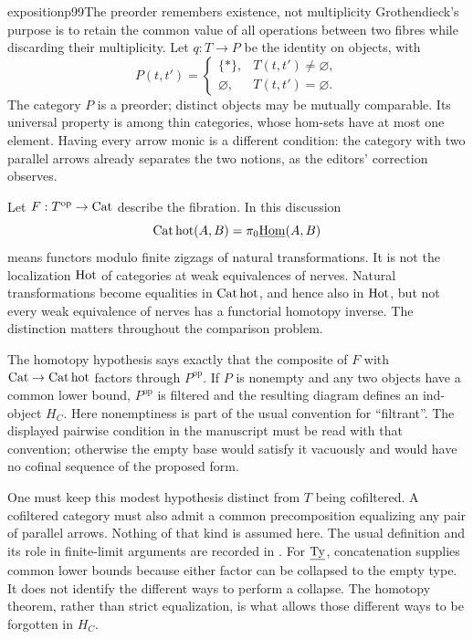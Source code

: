 \begin{dcomment}{exposition}{p99}{The preorder remembers existence, not multiplicity}
Grothendieck's purpose is to retain the common value of all operations between two fibres while discarding their multiplicity. Let $q:T\to P$ be the identity on objects, with
\[
 P(t,t')=\begin{cases}\{*\},&T(t,t')\ne\varnothing,\\
 \varnothing,&T(t,t')=\varnothing.\end{cases}
\]
The category $P$ is a preorder; distinct objects may be mutually comparable. Its universal property is among thin categories, whose hom-sets have at most one element. Having every arrow monic is a different condition: the category with two parallel arrows already separates the two notions, as the editors' correction observes.

Let $F:T^{\mathrm{op}}\to\mathrm{Cat}$ describe the fibration. In this discussion
\[
 \mathrm{Cat\,hot}(A,B)=\pi_0\underline{\mathrm{Hom}}(A,B)
\]
means functors modulo finite zigzags of natural transformations. It is not the localization $\mathrm{Hot}$ of categories at weak equivalences of nerves. Natural transformations become equalities in $\mathrm{Cat\,hot}$, and hence also in $\mathrm{Hot}$, but not every weak equivalence of nerves has a functorial homotopy inverse. The distinction matters throughout the comparison problem.

The homotopy hypothesis says exactly that the composite of $F$ with $\mathrm{Cat}\to\mathrm{Cat\,hot}$ factors through $P^{\mathrm{op}}$. If $P$ is nonempty and any two objects have a common lower bound, $P^{\mathrm{op}}$ is filtered and the resulting diagram defines an ind-object $H_C$. Here nonemptiness is part of the usual convention for ``filtrant''. The displayed pairwise condition in the manuscript must be read with that convention; otherwise the empty base would satisfy it vacuously and would have no cofinal sequence of the proposed form.

One must keep this modest hypothesis distinct from $T$ being cofiltered. A cofiltered category must also admit a common precomposition equalizing any pair of parallel arrows. Nothing of that kind is assumed here. The usual definition and its role in finite-limit arguments are recorded in \citet[Categories, Definition~4.19.1 and Lemma~4.19.2]{StacksProject}. For $\underline{\mathrm{Ty}}$, concatenation supplies common lower bounds because either factor can be collapsed to the empty type. It does not identify the different ways to perform a collapse. The homotopy theorem, rather than strict equalization, is what allows those different ways to be forgotten in $H_C$.
\end{dcomment}


